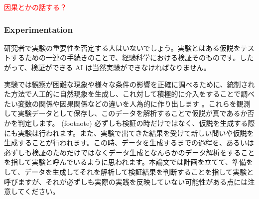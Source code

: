 \textcolor{red}{因果とかの話する？}




\subsubsection{Experimentation}
研究者で実験の重要性を否定する人はいないでしょう。実験とはある仮説をテストするための一連の手続きのことで、経験科学における検証そのものです。したがって、検証ができる AI は当然実験ができなければなりません。

実験では観察が困難な現象や様々な条件の影響を正確に調べるために、統制された方法で人工的に自然現象を生成し、これ対して積極的に介入をすることで調べたい変数の関係や因果関係などの違いを人為的に作り出します \cite{radder2009philosophy}。これらを観測して実験データとして保存し、このデータを解析することで仮説が真であるか否かを判定します。
(footnote) 必ずしも検証の時だけではなく、仮説を生成する際にも実験は行われます。また、実験で出てきた結果を受けて新しい問いや仮説を生成することが行われます。この時、データを生成するまでの過程を、あるいは必ずしも検証のためだけではなくデータ生成となんらかのデータ解析をすることを指して実験と呼んでいるように思われます。本論文では計画を立てて、準備をして、データを生成してそれを解析して検証結果を判断することを指して実験と呼びますが、それが必ずしも実際の実践を反映していない可能性がある点には注意してください。

